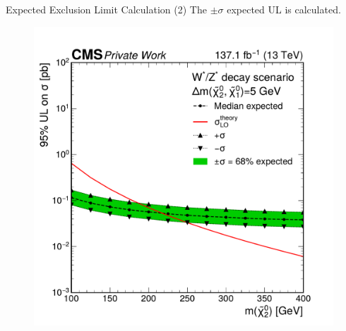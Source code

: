\begin{frame}[fragile]{Expected Exclusion Limit Calculation (2)}
  The \(\pm\sigma\) expected UL is calculated.
  \begin{figure}[htpb]
    \centering
    \includegraphics[height=0.6\textheight]{fig/limit-example/step-2.pdf}
  \end{figure}
\end{frame}

